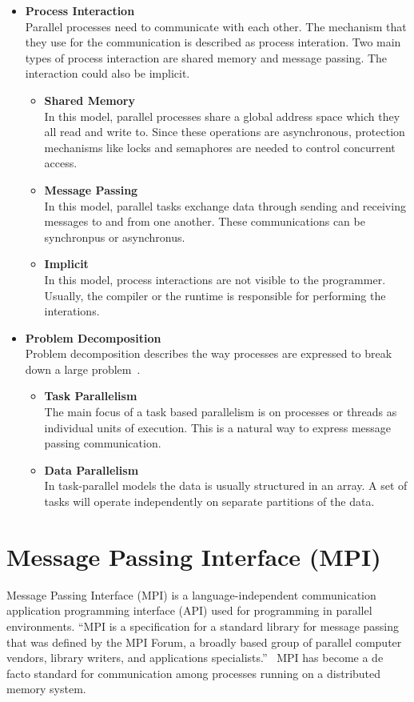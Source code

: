 \begin{itemize}
\item \textbf{Process Interaction}\\
  Parallel processes need to communicate with each other. The mechanism that they use for the communication is described as process interation. Two main types of process interaction are shared memory and message passing. The interaction could also be implicit.
  \begin{itemize}
  \item \textbf{Shared Memory}\\
    In this model, parallel processes share a global address space which they all read and write to. Since these operations are asynchronous, protection mechanisms like locks and semaphores are needed to control concurrent access.
  \item \textbf{Message Passing}\\
    In this model, parallel tasks exchange data through sending and receiving messages to and from one another. These communications can be synchronpus or asynchronus.
  \item \textbf{Implicit}\\
    In this model, process interactions are not visible to the programmer. Usually, the compiler or the runtime is responsible for performing the interations.
  \end{itemize}
\item \textbf{Problem Decomposition}\\
Problem decomposition describes the way processes are expressed to break down a large problem~\cite{Quinn:2003:PPC:1211440}.
  \begin{itemize}
  \item \textbf{Task Parallelism}\\
    The main focus of a task based parallelism is on processes or threads as individual units of execution. This is a natural way to express message passing communication.
  \item \textbf{Data Parallelism}\\
    In task-parallel models the data is usually structured in an array. A set of tasks will operate independently on separate partitions of the data.     
  \end{itemize}
\end{itemize}


\section{Message Passing Interface (MPI)}
Message Passing Interface (MPI) is a language-independent communication application programming interface (API) used for programming in parallel environments. ``MPI is a specification for a standard library for message passing that was defined by the MPI Forum, a broadly based group of parallel computer vendors, library writers, and applications specialists.''~\cite{gropp1996high} MPI has become a de facto standard for communication among processes running on a distributed memory system.

